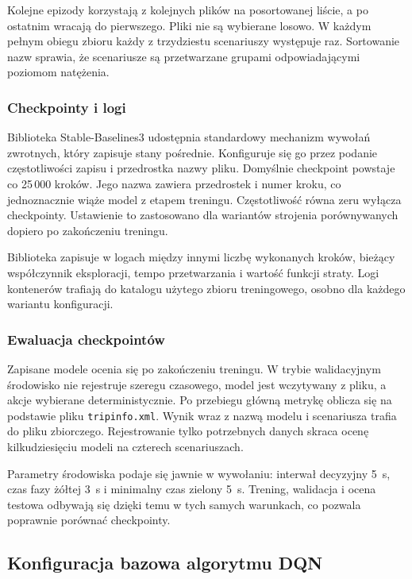 Kolejne epizody korzystają z kolejnych plików na posortowanej liście, a po ostatnim wracają do pierwszego. Pliki nie są wybierane losowo. W każdym pełnym obiegu zbioru każdy z trzydziestu scenariuszy występuje raz. Sortowanie nazw sprawia, że scenariusze są przetwarzane grupami odpowiadającymi poziomom natężenia.

\subsubsection{Checkpointy i logi}
\label{subsubsec:checkpointy-logi}

Biblioteka Stable-Baselines3 udostępnia standardowy mechanizm wywołań zwrotnych, który zapisuje stany pośrednie. Konfiguruje się go przez podanie częstotliwości zapisu i przedrostka nazwy pliku. Domyślnie checkpoint powstaje co 25\,000 kroków. Jego nazwa zawiera przedrostek i numer kroku, co jednoznacznie wiąże model z etapem treningu. Częstotliwość równa zeru wyłącza checkpointy. Ustawienie to zastosowano dla wariantów strojenia porównywanych dopiero po zakończeniu treningu.

Biblioteka zapisuje w logach między innymi liczbę wykonanych kroków, bieżący współczynnik eksploracji, tempo przetwarzania i wartość funkcji straty. Logi kontenerów trafiają do katalogu użytego zbioru treningowego, osobno dla każdego wariantu konfiguracji.

\subsubsection{Ewaluacja checkpointów}
\label{subsubsec:ewaluacja-checkpointow}

Zapisane modele ocenia się po zakończeniu treningu. W trybie walidacyjnym środowisko nie rejestruje szeregu czasowego, model jest wczytywany z pliku, a akcje wybierane deterministycznie. Po przebiegu główną metrykę oblicza się na podstawie pliku \texttt{tripinfo.xml}. Wynik wraz z nazwą modelu i scenariusza trafia do pliku zbiorczego. Rejestrowanie tylko potrzebnych danych skraca ocenę kilkudziesięciu modeli na czterech scenariuszach.

Parametry środowiska podaje się jawnie w wywołaniu: interwał decyzyjny 5~s, czas fazy żółtej 3~s i minimalny czas zielony 5~s. Trening, walidacja i ocena testowa odbywają się dzięki temu w tych samych warunkach, co pozwala poprawnie porównać checkpointy.

\subsection{Konfiguracja bazowa algorytmu DQN}
\label{subsec:konfiguracja-bazowa}


